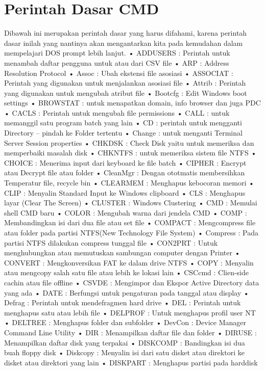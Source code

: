 \documentclass{article}
\begin{document}
\section{Perintah Dasar CMD}
Dibawah ini merupakan perintah dasar yang harus difahami, karena perintah dasar inilah yang nantinya akan mengantarkan kita pada kemudahan dalam mempelajari DOS prompt lebih lanjut.
• ADDUSERS : Perintah untuk menambah  daftar pengguna untuk atau dari CSV file
• ARP : Address Resolution Protocol
• Assoc : Ubah ekstensi file  asosiasi
• ASSOCIAT : Perintah yang digunakan untuk menjalankan asosiasi file
• Attrib : Perintah yang digunakan untuk mengubah atribut file
• Bootcfg : Edit Windows boot settings
• BROWSTAT : untuk menapatkan domain, info browser dan juga PDC
• CACLS : Perintah untuk mengubah file permissions
• CALL : untuk memanggil satu program batch yang lain
• CD : perintah untuk mengganti Directory – pindah ke Folder tertentu
• Change : untuk menganti Terminal Server Session properties
• CHKDSK : Check Disk yaitu untuk memeriksa dan memperbaiki masalah disk
• CHKNTFS : untuk memeriksa sistem file NTFS
• CHOICE : Menerima input dari keyboard ke file batch
• CIPHER : Encrypt atau Decrypt file atau folder
• CleanMgr : Dengan ototmatis membersihkan Temperatur file, recycle bin
• CLEARMEM : Menghapus kebocoran memori
• CLIP : Menyalin Standard Input ke Windows clipboard
• CLS : Menghapus layar (Clear The Screen)
• CLUSTER : Windows Clustering
• CMD : Memulai shell CMD baru
• COLOR : Mengubah warna dari jendela CMD
• COMP : Membandingkan isi dari dua file atau set file
• COMPACT : Mengcompress file atau folder pada partisi NTFS(New Technology File System)
• Compress : Pada partisi NTFS dilakukan compress tunggal file
• CON2PRT : Untuk menghubungkan atau memutuskan sambungan computer dengan Printer
• CONVERT : Mengkonversikan FAT ke dalam drive NTFS
• COPY : Menyalin atau mengcopy salah satu file atau lebih ke lokasi lain
• CSCcmd : Clien-side cachin atau file offline
• CSVDE : Mengimpor dan Ekspor Active Directory data yang ada
• DATE : Berfungsi untuk pengaturan pada tanggal atau display
• Defrag : Perintah untuk mendefragmen hard drive
• DEL : Perintah untuk menghapus satu atau lebih file
• DELPROF : Untuk menghapus  profil user NT
• DELTREE : Menghapus folder dan  subfolder
• DevCon : Device Manager Command Line Utility
• DIR : Menampilkan daftar file dan folder
• DIRUSE : Menampilkan daftar disk yang terpakai
• DISKCOMP : Bandingkan  isi dua buah floppy disk
• Diskcopy : Menyalin isi dari satu disket atau direktori ke disket atau direktori yang lain
• DISKPART : Menghapus partisi pada harddisk
\end{document}
